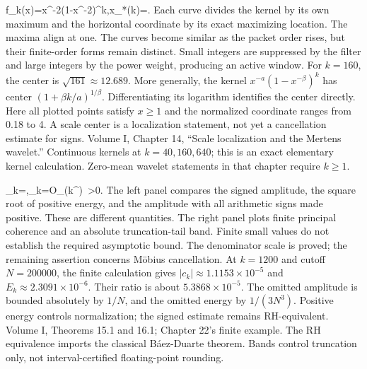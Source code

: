 {f_k(x)=x^{-2}(1-x^{-2})^k,\qquad x_*(k)=.}
{Each curve divides the kernel by its own maximum and the horizontal coordinate by its exact maximizing location. The maxima align at one. The curves become similar as the packet order rises, but their finite-order forms remain distinct. Small integers are suppressed by the filter and large integers by the power weight, producing an active window.}
{For $k=160$, the center is $\sqrt{161}\approx12.689$. More generally, the kernel $x^{-a}(1-x^{-\beta})^k$ has center $(1+\beta k/a)^{1/\beta}$. Differentiating its logarithm identifies the center directly. Here all plotted points satisfy $x\ge1$ and the normalized coordinate ranges from 0.18 to 4.}
{A scale center is a localization statement, not yet a cancellation estimate for signs.}
{Volume I, Chapter 14, ``Scale localization and the Mertens wavelet.'' Continuous kernels at $k=40,160,640$; this is an exact elementary kernel calculation. Zero-mean wavelet statements in that chapter require $k\ge1$.}

{\Gamma_k=,\qquad {}\iff\Gamma_k=O_\varepsilon(k^\varepsilon)\ \varepsilon>0.}
{The left panel compares the signed amplitude, the square root of positive energy, and the amplitude with all arithmetic signs made positive. These are different quantities. The right panel plots finite principal coherence and an absolute truncation-tail band. Finite small values do not establish the required asymptotic bound. The denominator scale is proved; the remaining assertion concerns Möbius cancellation.}
{At $k=1200$ and cutoff $N=200000$, the finite calculation gives $|c_k|\approx1.1153\times10^{-5}$ and $E_k\approx2.3091\times10^{-6}$. Their ratio is about $5.3868\times10^{-5}$. The omitted amplitude is bounded absolutely by $1/N$, and the omitted energy by $1/(3N^3)$.}
{Positive energy controls normalization; the signed estimate remains RH-equivalent.}
{Volume I, Theorems 15.1 and 16.1; Chapter 22's finite example. The RH equivalence imports the classical Báez-Duarte theorem. Bands control truncation only, not interval-certified floating-point rounding.}


